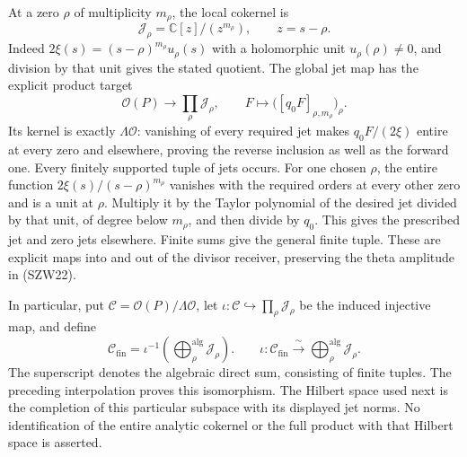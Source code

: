 \documentclass[
  10pt,
  a4paper,
]{article}
\begin{document}
At a zero \(\rho\) of multiplicity \(m_\rho\), the local cokernel is \[
\mathcal J_\rho=\mathbb C[z]/(z^{m_\rho}),\qquad z=s-\rho.
\tag{SZW30}
\] Indeed \(2\xi(s)=(s-\rho)^{m_\rho}u_\rho(s)\) with a holomorphic unit
\(u_\rho(\rho)\ne0\), and division by that unit gives the stated
quotient. The global jet map has the explicit product target \[
\mathcal O(P)\longrightarrow\prod_\rho\mathcal J_\rho,
\qquad F\longmapsto\bigl([q_0F]_{\rho,m_\rho}\bigr)_\rho.
\tag{SZW30a}
\] Its kernel is exactly \(\Lambda\mathcal O\): vanishing of every
required jet makes \(q_0F/(2\xi)\) entire at every zero and elsewhere,
proving the reverse inclusion as well as the forward one. Every finitely
supported tuple of jets occurs. For one chosen \(\rho\), the entire
function \(2\xi(s)/(s-\rho)^{m_\rho}\) vanishes with the required orders
at every other zero and is a unit at \(\rho\). Multiply it by the Taylor
polynomial of the desired jet divided by that unit, of degree below
\(m_\rho\), and then divide by \(q_0\). This gives the prescribed jet
and zero jets elsewhere. Finite sums give the general finite tuple.
These are explicit maps into and out of the divisor receiver, preserving
the theta amplitude in (SZW22).

In particular, put \(\mathcal C=\mathcal O(P)/\Lambda\mathcal O\), let
\(\iota:\mathcal C\hookrightarrow\prod_\rho\mathcal J_\rho\) be the
induced injective map, and define \[
\mathcal C_{\mathrm{fin}}
=\iota^{-1}\!\left(\bigoplus_\rho^{\mathrm{alg}}\mathcal J_\rho\right).
\qquad
\iota:\mathcal C_{\mathrm{fin}}\xrightarrow{\ \sim\ }
\bigoplus_\rho^{\mathrm{alg}}\mathcal J_\rho.
\tag{SZW30b}
\] The superscript denotes the algebraic direct sum, consisting of
finite tuples. The preceding interpolation proves this isomorphism. The
Hilbert space used next is the completion of this particular subspace
with its displayed jet norms. No identification of the entire analytic
cokernel or the full product with that Hilbert space is asserted.
\end{document}
